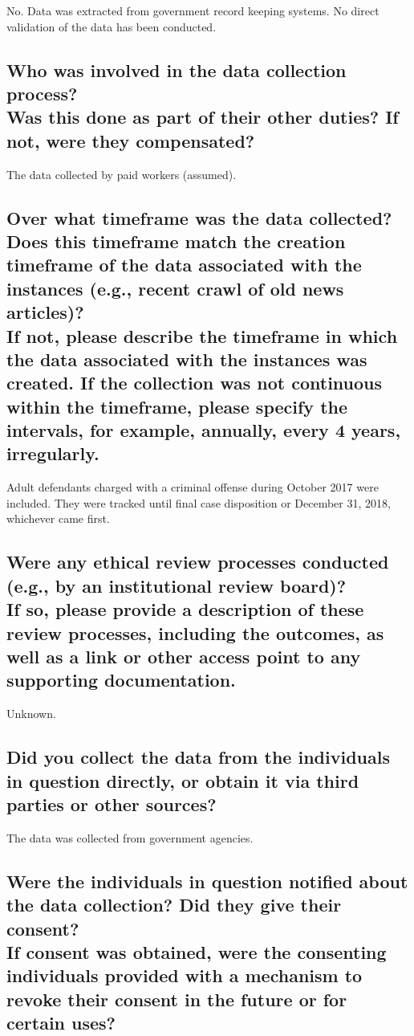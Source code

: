 \documentclass[letterpaper, 10 pt, conference]{ieeeconf}  %
\newcommand{\subtitle}[1]{{\\ \small \normalfont \color{purple} #1}}
\begin{document}
No. Data was extracted from government record keeping systems. No direct validation of the data has been conducted. 

\subsection{Who was involved in the data collection process? \subtitle{Was this done as part of their other duties? If not, were they compensated?}}
 
The data collected by paid workers (assumed).

\subsection{Over what timeframe was the data collected? Does this timeframe match the creation timeframe of the data associated with the instances (e.g., recent crawl of old news articles)? \subtitle{If not, please describe the timeframe in which the data associated with the instances was created. If the collection was not continuous within the timeframe, please specify the intervals, for example, annually, every 4 years, irregularly.}}

Adult defendants charged with a criminal offense during October 2017 were included. They were tracked until final case disposition or December 31, 2018, whichever came first.


\subsection{Were any ethical review processes conducted (e.g., by an institutional review board)? \subtitle{If so, please provide a description of these review processes, including the outcomes, as well as a link or other access point to any supporting documentation.}}

Unknown.

\subsection{Did you collect the data from the individuals in question directly, or obtain it via third parties or other sources?}

The data was collected from government agencies. 

\subsection{Were the individuals in question notified about the data collection? Did they give their consent? \subtitle{If consent was obtained, were the consenting individuals provided with a mechanism to revoke their consent in the future or for certain uses?}}
\end{document}
